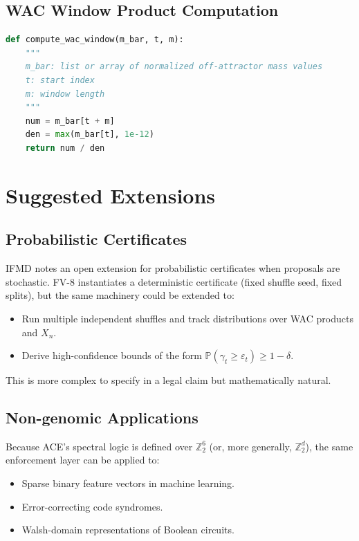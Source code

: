 \documentclass[11pt]{article}
\begin{document}
\subsection{WAC Window Product Computation}

\begin{lstlisting}[style=code,language=Python,caption={WAC window product with stability floor}]
def compute_wac_window(m_bar, t, m):
    """
    m_bar: list or array of normalized off-attractor mass values
    t: start index
    m: window length
    """
    num = m_bar[t + m]
    den = max(m_bar[t], 1e-12)
    return num / den
\end{lstlisting}

\section{Suggested Extensions}

\subsection{Probabilistic Certificates}

IFMD notes an open extension for probabilistic certificates when proposals are stochastic. FV-8 instantiates a deterministic certificate (fixed shuffle seed, fixed splits), but the same machinery could be extended to:

\begin{itemize}[nosep]
  \item Run multiple independent shuffles and track distributions over WAC products and $X_n$.
  \item Derive high-confidence bounds of the form $\mathbb{P}(\gamma_t \ge \varepsilon_t) \ge 1 - \delta$.
\end{itemize}

This is more complex to specify in a legal claim but mathematically natural.

\subsection{Non-genomic Applications}

Because ACE's spectral logic is defined over $\mathbb{Z}_2^6$ (or, more generally, $\mathbb{Z}_2^d$), the same enforcement layer can be applied to:

\begin{itemize}[nosep]
  \item Sparse binary feature vectors in machine learning.
  \item Error-correcting code syndromes.
  \item Walsh-domain representations of Boolean circuits.
\end{itemize}
\end{document}

